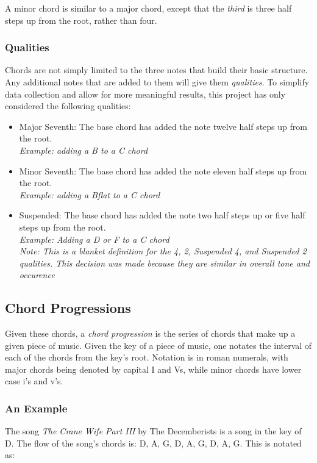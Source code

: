﻿\documentclass{article}
\begin{document}
		A minor chord is similar to a major chord, except that the \emph{third} 
		is three half steps up from the root, rather than four.

		\subsubsection{Qualities}
		Chords are not simply limited to the three notes that build their basic 
		structure.  Any additional notes that are added to them will give them 
		\emph{qualities}. To simplify data collection and allow for more meaningful 
		results, this project has only considered the following qualities:

		\begin{itemize}
			\item Major Seventh:  The base chord has added the note twelve half 
				steps up from the root.\\
				\emph{Example:  adding a B to a C chord}
			\item Minor Seventh:  The base chord has added the note eleven half 
				steps up from the root.\\  
				\emph{Example:  adding a Bflat to a C chord}
			\item Suspended:  The base chord has added the note two half steps 
				up or five half steps up from the root. \\  
				\emph{Example:  Adding a D or F to a C chord}\\
				\emph{Note:  This is a blanket definition 
				for the 4, 2, Suspended 4, and Suspended 2 qualities.  This decision 
				was made because they are similar in overall tone and occurence}
		\end{itemize}

	\subsection{Chord Progressions}
	Given these chords, a \emph{chord progression} is the series of chords 
	that make up a given piece of music.  Given the key of a piece of music, 
	one notates the interval of each of the chords from the key's root.  
	Notation is in roman numerals, with major chords being denoted by capital 
	I and Vs, while minor chords have lower case i's and v's.

		\subsubsection{An Example}
		The song \emph{The Crane Wife Part III} by The Decemberists is a song 
		in the key of D.  The flow of the song's chords is:  D, A, G, D, A, G, D, A, G.  
		This is notated as:\\
\end{document}

